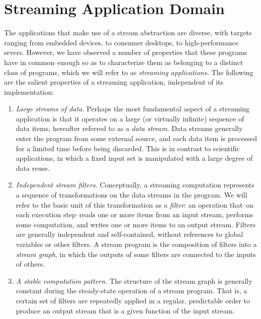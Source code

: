 \section{Streaming Application Domain}
\label{sec:domain}

The applications that make use of a stream abstraction are diverse,
with targets ranging from embedded devices, to consumer desktops, to
high-performance severs.  However, we have observed a number of
properties that these programs have in common--enough so as to
characterize them as belonging to a distinct class of programs, which
we will refer to as {\it streaming applications.}  The following are
the salient properties of a streaming application, independent of its
implementation:
\begin{enumerate}
\item {\it Large streams of data.}  Perhaps the most fundamental
aspect of a streaming application is that it operates on a large (or
virtually infinite) sequence of data items, hereafter referred to as a
{\it data stream}.  Data streams generally enter the program from some
external source, and each data item is processed for a limited time
before being discarded.  This is in contrast to scientific
applications, in which a fixed input set is manipulated with a large
degree of data reuse.

\item {\it Independent stream filters.}  Conceptually, a streaming computation
represents a sequence of transformations on the data streams in the
program.  We will refer to the basic unit of this transformation as a
{\it filter}: an operation that--on each execution step--reads one or
more items from an input stream, performs some computation, and writes
one or more items to an output stream.  Filters are generally
independent and self-contained, without references to global variables
or other filters.  A stream program is the composition of filters into
a {\it stream graph}, in which the outputs of some filters are
connected to the inputs of others.

\item {\it A stable computation pattern.}  The structure of the stream
graph is generally constant during the steady-state operation of a
stream program.  That is, a certain set of filters are repeatedly
applied in a regular, predictable order to produce an output stream
that is a given function of the input stream.


\end{enumerate}
